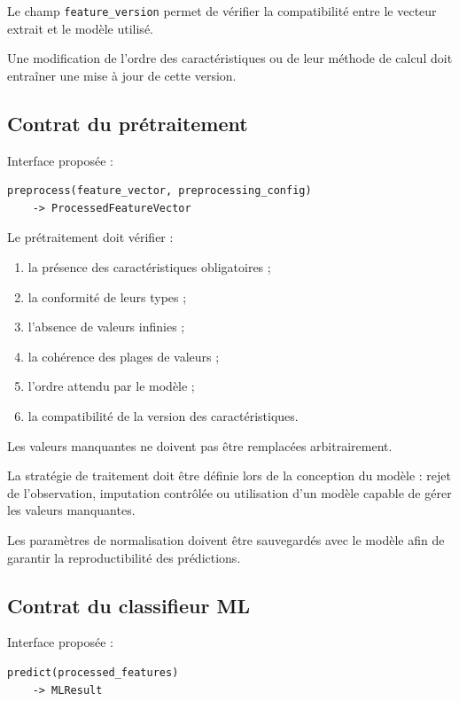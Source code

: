 Le champ \texttt{feature\_version} permet de vérifier la compatibilité entre le vecteur extrait et le modèle utilisé.

Une modification de l'ordre des caractéristiques ou de leur méthode de calcul doit entraîner une mise à jour de cette version.

\subsection{Contrat du prétraitement}

Interface proposée :

\begin{verbatim}
preprocess(feature_vector, preprocessing_config)
    -> ProcessedFeatureVector
\end{verbatim}

Le prétraitement doit vérifier :

\begin{enumerate}
    \item la présence des caractéristiques obligatoires ;
    \item la conformité de leurs types ;
    \item l'absence de valeurs infinies ;
    \item la cohérence des plages de valeurs ;
    \item l'ordre attendu par le modèle ;
    \item la compatibilité de la version des caractéristiques.
\end{enumerate}

Les valeurs manquantes ne doivent pas être remplacées arbitrairement.

La stratégie de traitement doit être définie lors de la conception du modèle : rejet de l'observation, imputation contrôlée ou utilisation d'un modèle capable de gérer les valeurs manquantes.

Les paramètres de normalisation doivent être sauvegardés avec le modèle afin de garantir la reproductibilité des prédictions.

\subsection{Contrat du classifieur ML}

Interface proposée :

\begin{verbatim}
predict(processed_features)
    -> MLResult
\end{verbatim}

